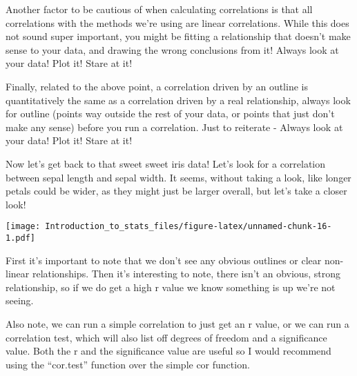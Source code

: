 \documentclass[
]{article}
\newenvironment{Shaded}{\begin{snugshade}}{\end{snugshade}}
\newcommand{\CommentTok}[1]{\textcolor[rgb]{0.56,0.35,0.01}{\textit{#1}}}
\newcommand{\KeywordTok}[1]{\textcolor[rgb]{0.13,0.29,0.53}{\textbf{#1}}}
\newcommand{\NormalTok}[1]{#1}
\newcommand{\OperatorTok}[1]{\textcolor[rgb]{0.81,0.36,0.00}{\textbf{#1}}}
\begin{document}
Another factor to be cautious of when calculating correlations is that
all correlations with the methods we're using are linear correlations.
While this does not sound super important, you might be fitting a
relationship that doesn't make sense to your data, and drawing the wrong
conclusions from it! Always look at your data! Plot it! Stare at it!

Finally, related to the above point, a correlation driven by an outline
is quantitatively the same as a correlation driven by a real
relationship, always look for outline (points way outside the rest of
your data, or points that just don't make any sense) before you run a
correlation. Just to reiterate - Always look at your data! Plot it!
Stare at it!

Now let's get back to that sweet sweet iris data! Let's look for a
correlation between sepal length and sepal width. It seems, without
taking a look, like longer petals could be wider, as they might just be
larger overall, but let's take a closer look!

\begin{Shaded}
\end{Shaded}

\texttt{[image: Introduction\_to\_stats\_files/figure-latex/unnamed-chunk-16-1.pdf]}

First it's important to note that we don't see any obvious outlines or
clear non-linear relationships. Then it's interesting to note, there
isn't an obvious, strong relationship, so if we do get a high r value we
know something is up we're not seeing.

Also note, we can run a simple correlation to just get an r value, or we
can run a correlation test, which will also list off degrees of freedom
and a significance value. Both the r and the significance value are
useful so I would recommend using the ``cor.test'' function over the
simple cor function.

\begin{Shaded}
\end{Shaded}
\end{document}
